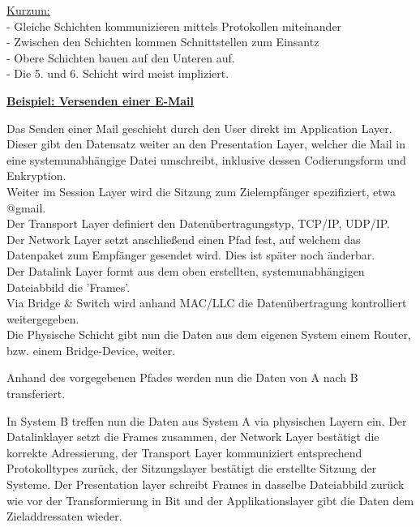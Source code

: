 \documentclass[11pt]{article}
\begin{document}
    \underline{Kurzum:}\\
    - Gleiche Schichten kommunizieren mittels Protokollen miteinander\\
    - Zwischen den Schichten kommen Schnittstellen zum Einsantz\\
    - Obere Schichten bauen auf den Unteren auf.\\
    - Die 5. und 6. Schicht wird meist impliziert.\\

    \begin{addmargin}[1em]{2em}
        \textbf{\underline{Beispiel: Versenden einer E-Mail}}
    \end{addmargin}
    Das Senden einer Mail geschieht durch den User direkt im Application Layer.\\
    Dieser gibt den Datensatz weiter an den Presentation Layer, welcher die Mail in eine
    systemunabhängige Datei umschreibt, inklusive dessen Codierungsform und Enkryption.\\
    Weiter im Session Layer wird die Sitzung zum Zielempfänger spezifiziert, etwa @gmail.\\
    Der Transport Layer definiert den Datenübertragungstyp, TCP/IP, UDP/IP.\\
    Der Network Layer setzt anschließend einen Pfad fest, auf welchem das Datenpaket zum Empfänger
    gesendet wird. Dies ist später noch änderbar.\\
    Der Datalink Layer formt aus dem oben erstellten, systemunabhängigen Dateiabbild die 'Frames'.\\
    Via Bridge \& Switch wird anhand MAC/LLC die Datenübertragung kontrolliert weitergegeben.\\
    Die Physische Schicht gibt nun die Daten aus dem eigenen System einem Router, bzw. einem Bridge-Device, weiter.\\

\begin{addmargin}[1em]{0em}
    Anhand des vorgegebenen Pfades werden nun die Daten von A nach B transferiert.\\
\end{addmargin}
    In System B treffen nun die Daten aus System A via physischen Layern ein.  Der Datalinklayer setzt die Frames zusammen,
    der Network Layer bestätigt die korrekte Adressierung, der Transport Layer kommuniziert entsprechend Protokolltypes zurück,
    der Sitzungslayer bestätigt die erstellte Sitzung der Systeme. Der Presentation layer schreibt Frames in dasselbe Dateiabbild zurück
    wie vor der Transformierung in Bit und der Applikationslayer gibt die Daten dem Zieladdressaten wieder.
\end{document}
